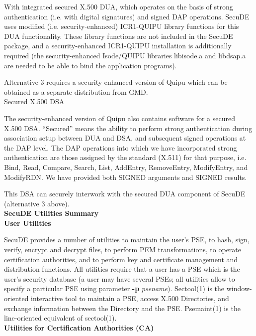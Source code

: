 \m With integrated secured X.500 DUA, which operates on the basis of
   strong authentication (i.e. with digital signatures) and signed DAP
   operations.
   SecuDE uses modified (i.e. security-enhanced) ICR1-QUIPU library 
   functions for this DUA functionality. These library functions are not 
   included in the SecuDE package, and a security-enhanced ICR1-QUIPU 
   installation is additionally required (the security-enhanced 
   Isode/QUIPU libraries libisode.a and libdsap.a are needed to be able 
   to bind the application programs).
\ee

Alternative 3 requires a security-enhanced version of Quipu which can
be obtained as a separate distribution from GMD. 
\\ [1em]
Secured X.500 DSA

The security-enhanced version of Quipu also contains software for a secured 
X.500 DSA. ``Secured'' means the ability to perform strong authentication 
during association setup between DUA and DSA, and subsequent signed 
operations at the DAP level. The DAP operations into which we have 
incorporated strong authentication are those assigned by the standard 
(X.511) for that purpose, i.e. Bind, Read, Compare, Search, List, AddEntry,
RemoveEntry, ModifyEntry, and ModifyRDN. We have provided both SIGNED 
arguments and SIGNED results.

This DSA can securely interwork with the secured DUA component of SecuDE 
(alternative 3 above).
\\ [1em]

{\large\bf SecuDE Utilities Summary}
\\[1em]
{\bf User Utilities}

SecuDE provides a number 
of utilities to maintain the user's PSE, to hash, sign, verify, 
encrypt and decrypt files, to perform PEM transformations, to
operate certification authorities, and to perform key and certificate
management and distribution functions. All utilities require that
a user has a PSE which is the user's security database (a user may have
several PSEs; all utilities allow to specify a particular PSE using
parameter {\bf -p} {\em psename}). Sectool(1) is the window-oriented
interactive tool to maintain a PSE, access X.500 Directories, and
exchange information between the Directory and the PSE.
Psemaint(1) is the line-oriented equivalent of sectool(1).   
\\ [1em]
{\bf Utilities for Certification Authorities (CA)}
 
